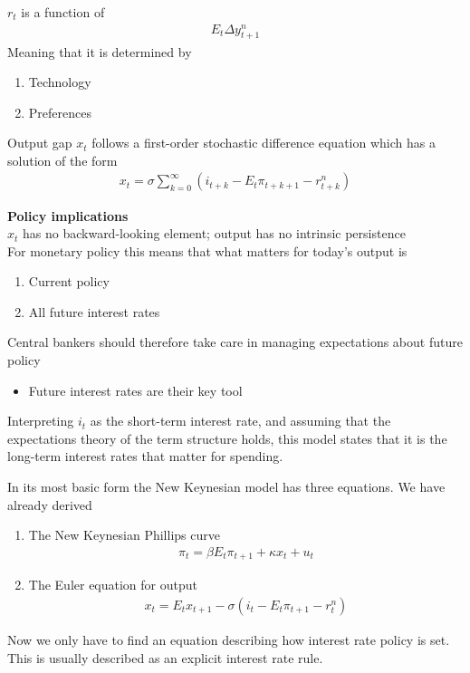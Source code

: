 \documentclass{beamer}
\begin{document}
\begin{frame}
  $r_t$ is a function of
  \begin{align}
    E_t \Delta y_{t+1}^n
  \end{align}
  Meaning that it is determined by 
  \begin{enumerate}
    \item Technology
    \item Preferences
  \end{enumerate}
  Output gap $x_t$ follows a first-order stochastic difference equation which has a solution of the form
\begin{align}
  x_t = \sigma \sum_{k=0}^{\infty} (i_{t+k} - E_t \pi_{t+k+1} - r_{t+k}^n)  
\end{align}  
\end{frame}

\begin{frame}
  \textbf{Policy implications}\\
   $x_t$ has no backward-looking element; output has no intrinsic persistence\\
   For monetary policy this means that what matters for today's output is
   \begin{enumerate}
     \item Current policy
     \item All future interest rates
   \end{enumerate}
  \medskip
  Central bankers should therefore take care in managing expectations about future policy
  \begin{itemize}
    \item Future interest rates are their key tool
  \end{itemize}
Interpreting $i_t$ as the short-term interest rate, and assuming that the expectations theory of the term structure holds, this model states that it is the long-term interest rates that matter for spending. 

\end{frame}

\begin{frame}
  In its most basic form the New Keynesian model has three equations. 
We have already derived 
\begin{enumerate}
  \item The New Keynesian Phillips curve
  \begin{align} \pi_t=\beta E_t \pi_{t+1} + \kappa x_t + u_t \end{align}
  \item The Euler equation for output
  \begin{align} x_t =E_t x_{t+1} - \sigma (i_t - E_t \pi_{t+1} - r_t^n) \end{align}
\end{enumerate}
Now we only have to find an equation describing how interest rate policy is set. 
This is usually described as an explicit interest rate rule.  
\end{frame}
\end{document}
